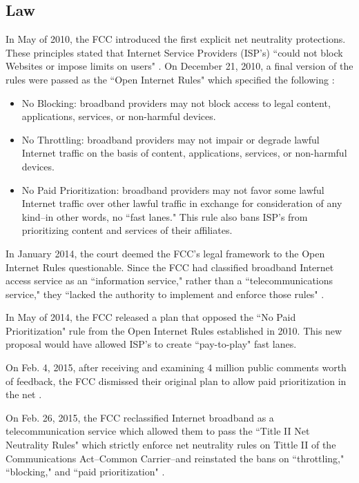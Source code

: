 \documentclass[11pt]{article}
\begin{document}
\subsection{Law}
In May of 2010, the FCC introduced the first explicit net neutrality protections.  These principles stated that Internet Service Providers (ISP's) ``could not block Websites or impose limits on users" \cite{WH}.  On December 21, 2010, a final version of the rules were passed as the ``Open Internet Rules" which specified the following \cite{FCC}:
\begin{itemize}
\item No Blocking: broadband providers may not block access to legal content, applications, services, or non-harmful devices.
\item No Throttling: broadband providers may not impair or degrade lawful Internet traffic on the basis of content, applications, services, or non-harmful devices.
\item No Paid Prioritization: broadband providers may not favor some lawful Internet traffic over other lawful traffic in exchange for consideration of any kind--in other words, no ``fast lanes." This rule also bans ISP's from prioritizing content and services of their affiliates.
\end{itemize}

In January 2014, the court deemed the FCC's legal framework  to the Open Internet Rules questionable.  Since the FCC had classified broadband Internet access service as an ``information service," rather than a ``telecommunications service," they ``lacked the authority to implement and enforce those rules" \cite{FP}.

In May of 2014, the FCC released a plan that opposed the ``No Paid Prioritization" rule from the Open Internet Rules established in 2010.  This new proposal would have allowed ISP's to create ``pay-to-play" fast lanes. 

On Feb. 4, 2015, after receiving and examining 4 million public comments worth of feedback, the FCC dismissed their original plan to allow paid prioritization in the net \cite{WH}\cite{FP}.

On Feb. 26, 2015, the FCC reclassified Internet broadband as a telecommunication service which allowed them to pass the ``Title II Net Neutrality Rules" which strictly enforce net neutrality rules on Tittle II of the Communications Act--Common Carrier--and reinstated the bans on ``throttling," ``blocking," and ``paid prioritization" \cite{FP}.
\end{document}
